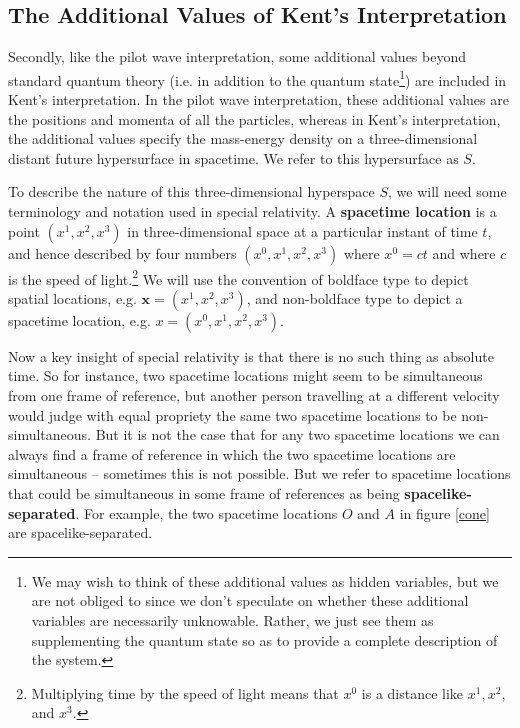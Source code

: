 \subsection{The Additional Values of Kent's Interpretation\label{additional}}
Secondly, like the pilot wave interpretation, some additional values beyond standard quantum theory (i.e. in addition to the quantum state\footnote{We may wish to think of these additional values as hidden variables, but we are not obliged to since we don't speculate on whether these additional variables are necessarily unknowable. Rather, we just see them as supplementing the quantum state so as to provide a complete description of the system.}) are included in Kent's interpretation. In the pilot wave interpretation, these additional values are the positions and momenta of all the particles, whereas in Kent's interpretation, the additional values specify the mass-energy density on a three-dimensional distant future hypersurface in spacetime. We refer to this hypersurface as $S$. 

To describe the nature of this three-dimensional hyperspace $S$, we will need some terminology and notation used in special relativity. A \textbf{spacetime location} is a point $(x^1,x^2,x^3)$ in three-dimensional space at a particular instant of time $t$, and hence described by four numbers $(x^0,x^1,x^2,x^3)$ where $x^0=c t$ and where $c$ is the speed of light.\footnote{Multiplying time by the speed of light means that $x^0$ is a distance like $x^1,x^2$, and $x^3$. } We will use the convention of boldface type to depict spatial locations, e.g. $\bm{x}=(x^1,x^2,x^3)$, and non-boldface type to depict a spacetime location, e.g. $x=(x^0,x^1,x^2,x^3)$. 

Now a key insight of special relativity is that there is no such thing as absolute time. So for instance, two spacetime locations might seem to be simultaneous from one frame of reference, but another person travelling at a different velocity would judge with equal propriety the same two spacetime locations to be non-simultaneous. But it is not the case that for any two spacetime locations we can always find a frame of reference in which the two spacetime locations are simultaneous -- sometimes this is not possible. But we refer to spacetime locations that could be simultaneous in some frame of references as being \textbf{spacelike-separated}. For example, the two spacetime locations $O$ and $A$  in figure \ref{cone} are spacelike-separated. 

